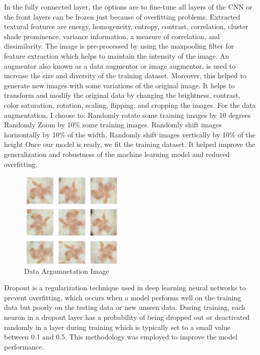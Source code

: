 \documentclass[twocolumn]{article}
\begin{document}
In the fully connected layer, the options are to fine-tune all layers of the CNN or the front layers can be frozen just because of overfitting problems.
Extracted textural features are energy, homogeneity, entropy, contrast, correlation, cluster shade
prominence, variance information, a measure of correlation, and dissimilarity. The image is pre-processed by using the maxpooling filter for feature extraction which helps to maintain the intensity of the image.
An augmentor also known as a data augmentor or image augmentor, is used to increase the size and diversity of the training dataset. Moreover, this helped to generate new images with some variations of the original image. It helps to transform and modify the original data by changing the brightness, contrast, color saturation, rotation, scaling, flipping, and cropping the images.
For the data augmentation, I choose to: Randomly rotate some training images by 10 degrees Randomly Zoom by 10\% some training images. Randomly shift images horizontally by 10\% of the width. Randomly shift images vertically by 10\% of the height Once our model is ready, we fit the training dataset. It helped improve the generalization and robustness of the machine learning model and reduced overfitting. 

\begin{figure}
  \centering
  \includegraphics[width=0.45\textwidth]{augmented data.png}
  \caption{Data Argumnetation Image}
  \label{fig:image}
\end{figure}

Dropout is a regularization technique used in deep learning neural networks to prevent overfitting, which occurs when a model performs well on the training data but poorly on the testing data or new unseen data.
During training, each neuron in a dropout layer has a probability of being dropped out or deactivated randomly in a layer during training which is typically set to a small value between 0.1 and 0.5.  This methodology was employed to improve the model performance.
\end{document}
